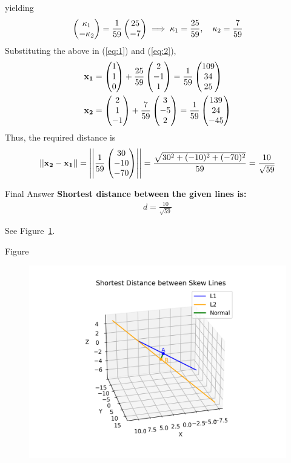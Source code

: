 \documentclass{beamer}
\begin{document}
yielding
\begin{align}
    \begin{pmatrix}\kappa_1 \\ -\kappa_2\end{pmatrix} = \frac{1}{59}\begin{pmatrix}25 \\ -7\end{pmatrix} \implies \kappa_1 = \frac{25}{59}, \quad \kappa_2 = \frac{7}{59} \label{eq:3}
\end{align}
Substituting the above in (\ref{eq:1}) and (\ref{eq:2}),
\begin{align}
    \mathbf{x_1} &= \begin{pmatrix}1 \\ 1 \\ 0\end{pmatrix} + \frac{25}{59}\begin{pmatrix}2 \\ -1 \\ 1\end{pmatrix} = \frac{1}{59}\begin{pmatrix}109 \\ 34 \\ 25\end{pmatrix} \\
    \mathbf{x_2} &= \begin{pmatrix}2 \\ 1 \\ -1\end{pmatrix} + \frac{7}{59}\begin{pmatrix}3 \\ -5 \\ 2\end{pmatrix} = \frac{1}{59}\begin{pmatrix}139 \\ 24 \\ -45\end{pmatrix}
\end{align}
Thus, the required distance is
\begin{align}
    ||\mathbf{x_2} - \mathbf{x_1}|| = \left|\left|\frac{1}{59}\begin{pmatrix}30 \\ -10 \\ -70\end{pmatrix}\right|\right| = \frac{\sqrt{30^2 + (-10)^2 + (-70)^2}}{59} = \frac{10}{\sqrt{59}}
\end{align}


\begin{frame}{Final Answer}
\noindent
\textbf{Shortest distance between the given lines is:} \\
\begin{align}
    d = \frac{10}{\sqrt{59}}
\end{align}

See Figure~\ref{fig:3DVectors}.   
\end{frame}

\begin{frame}{Figure}
    \begin{figure}[h!]
    \centering
    \includegraphics[width=0.7\linewidth]{figs/fig.png}
    \caption{}
    \label{fig:3DVectors}
\end{figure}
\end{frame}
\end{document}
